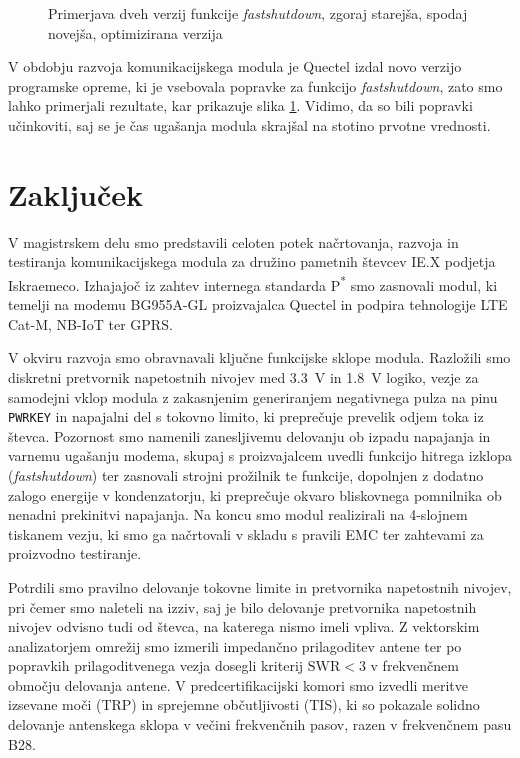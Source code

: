 \documentclass[a4paper,twoside,openright,12pt,slovene]{book}
\begin{document}
\begin{figure}[h]
    \centering
     \vspace{2mm} 
    
    \caption{Primerjava dveh verzij funkcije \textit{fastshutdown}, zgoraj starejša, spodaj novejša, optimizirana verzija}
    \label{rezultati}
\end{figure}


V obdobju razvoja komunikacijskega modula je Quectel izdal novo verzijo programske opreme, ki je vsebovala popravke za funkcijo \textit{fastshutdown}, zato smo lahko primerjali rezultate, kar prikazuje slika \ref{rezultati}. Vidimo, da so bili popravki učinkoviti, saj se je čas ugašanja modula skrajšal na stotino prvotne vrednosti.




\chapter{Zaključek}
V magistrskem delu smo predstavili celoten potek načrtovanja, razvoja in testiranja komunikacijskega modula za družino pametnih števcev IE.X podjetja Iskraemeco. Izhajajoč iz zahtev internega standarda P\textsuperscript{*} smo zasnovali modul, ki temelji na modemu BG955A-GL proizvajalca Quectel in podpira tehnologije LTE Cat-M, NB-IoT ter GPRS.

V okviru razvoja smo obravnavali ključne funkcijske sklope modula. Razložili smo diskretni pretvornik napetostnih nivojev med \SI{3,3}{\volt} in \SI{1,8}{\volt} logiko, vezje za samodejni vklop modula z zakasnjenim generiranjem negativnega pulza na pinu \texttt{PWRKEY} in napajalni del s tokovno limito, ki preprečuje prevelik odjem toka iz števca. Pozornost smo namenili zanesljivemu delovanju ob izpadu napajanja in varnemu ugašanju modema, skupaj s proizvajalcem uvedli funkcijo hitrega izklopa (\textit{fastshutdown}) ter zasnovali strojni prožilnik te funkcije, dopolnjen z dodatno zalogo energije v kondenzatorju, ki preprečuje okvaro bliskovnega pomnilnika ob nenadni prekinitvi napajanja. Na koncu smo modul realizirali na 4-slojnem tiskanem vezju, ki smo ga načrtovali v skladu s pravili EMC ter zahtevami za proizvodno testiranje.

 Potrdili smo pravilno delovanje tokovne limite in pretvornika napetostnih nivojev, pri čemer smo naleteli na izziv, saj je bilo delovanje pretvornika napetostnih nivojev odvisno tudi od števca, na katerega nismo imeli vpliva. Z vektorskim analizatorjem omrežij smo izmerili impedančno prilagoditev antene ter po popravkih prilagoditvenega vezja dosegli kriterij $\mathrm{SWR} < 3$ v frekvenčnem območju delovanja antene. V predcertifikacijski komori smo izvedli meritve izsevane moči (TRP) in sprejemne občutljivosti (TIS), ki so pokazale solidno delovanje antenskega sklopa v večini frekvenčnih pasov, razen v frekvenčnem pasu B28. 
 
\end{document}
